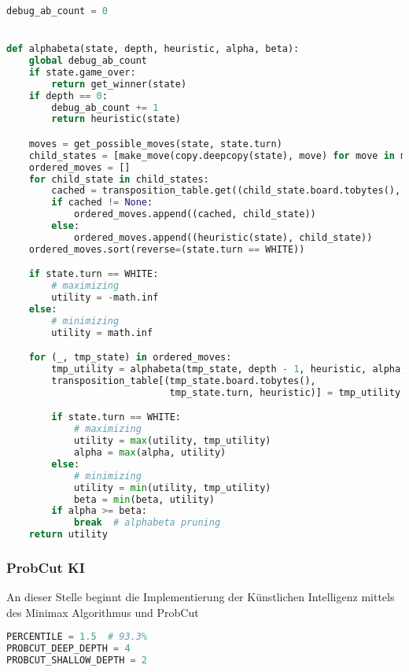 \begin{lstlisting}[language=Python]
debug_ab_count = 0


def alphabeta(state, depth, heuristic, alpha, beta):
    global debug_ab_count
    if state.game_over:
        return get_winner(state)
    if depth == 0:
        debug_ab_count += 1
        return heuristic(state)

    moves = get_possible_moves(state, state.turn)
    child_states = [make_move(copy.deepcopy(state), move) for move in moves]
    ordered_moves = []
    for child_state in child_states:
        cached = transposition_table.get((child_state.board.tobytes(), child_state.turn, heuristic), None)
        if cached != None:
            ordered_moves.append((cached, child_state))
        else:
            ordered_moves.append((heuristic(state), child_state))
    ordered_moves.sort(reverse=(state.turn == WHITE))

    if state.turn == WHITE:
        # maximizing
        utility = -math.inf
    else:
        # minimizing
        utility = math.inf

    for (_, tmp_state) in ordered_moves:
        tmp_utility = alphabeta(tmp_state, depth - 1, heuristic, alpha, beta)
        transposition_table[(tmp_state.board.tobytes(),
                             tmp_state.turn, heuristic)] = tmp_utility

        if state.turn == WHITE:
            # maximizing
            utility = max(utility, tmp_utility)
            alpha = max(alpha, utility)
        else:
            # minimizing
            utility = min(utility, tmp_utility)
            beta = min(beta, utility)
        if alpha >= beta:
            break  # alphabeta pruning
    return utility
\end{lstlisting}

\hypertarget{probcut-ki}{%
\subsubsection{ProbCut KI}\label{probcut-ki}}

An dieser Stelle beginnt die Implementierung der Künstlichen Intelligenz
mittels des Minimax Algorithmus und ProbCut

\begin{lstlisting}[language=Python]
PERCENTILE = 1.5  # 93.3%
PROBCUT_DEEP_DEPTH = 4
PROBCUT_SHALLOW_DEPTH = 2
\end{lstlisting}

